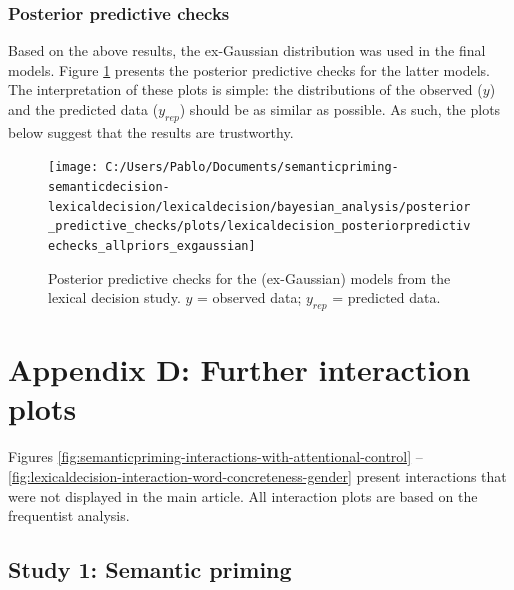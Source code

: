 \documentclass[
  12pt,
  man,floatsintext]{apa7}
\begin{document}
\hypertarget{posterior-predictive-checks-2}{%
\subsubsection{Posterior predictive checks}\label{posterior-predictive-checks-2}}

Based on the above results, the ex-Gaussian distribution was used in the final models. Figure \ref{fig:lexicaldecision-posteriorpredictivechecks-allpriors-exgaussian} presents the posterior predictive checks for the latter models. The interpretation of these plots is simple: the distributions of the observed (\(y\)) and the predicted data (\(y_{rep}\)) should be as similar as possible. As such, the plots below suggest that the results are trustworthy.



\begin{figure}

{\centering \texttt{[image: C:/Users/Pablo/Documents/semanticpriming-semanticdecision-lexicaldecision/lexicaldecision/bayesian\_analysis/posterior\_predictive\_checks/plots/lexicaldecision\_posteriorpredictivechecks\_allpriors\_exgaussian]} 

}

\caption{Posterior predictive checks for the (ex-Gaussian) models from the lexical decision study. \(y\) = observed data; \(y_{rep}\) = predicted data.}\label{fig:lexicaldecision-posteriorpredictivechecks-allpriors-exgaussian}
\end{figure}

\clearpage

\renewcommand{\thefigure}{D\arabic{figure}} \setcounter{figure}{0}
\renewcommand{\thetable}{D\arabic{table}} \setcounter{table}{0}

\hypertarget{appendix-D-interaction-plots}{%
\section{Appendix D: Further interaction plots}\label{appendix-D-interaction-plots}}

Figures \ref{fig:semanticpriming-interactions-with-attentional-control} -- \ref{fig:lexicaldecision-interaction-word-concreteness-gender} present interactions that were not displayed in the main article. All interaction plots are based on the frequentist analysis.

\hypertarget{study-1-semantic-priming-3}{%
\subsection{Study 1: Semantic priming}\label{study-1-semantic-priming-3}}
\end{document}
